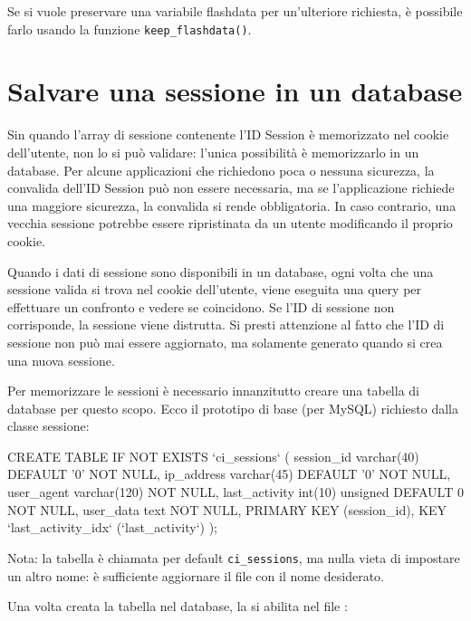 Se si vuole preservare una variabile flashdata per un'ulteriore richiesta, è possibile farlo usando la funzione \verb|keep_flashdata()|.

\section*{Salvare una sessione in un database}
Sin quando l'array di sessione contenente l'ID Session è memorizzato nel cookie dell'utente, non lo si può validare: l'unica possibilità è memorizzarlo in un database. Per alcune applicazioni che richiedono poca o nessuna sicurezza, la convalida dell'ID Session può non essere necessaria, ma se l'applicazione richiede una maggiore sicurezza, la convalida si rende obbligatoria. In caso contrario, una vecchia sessione potrebbe essere ripristinata da un utente modificando il proprio cookie.

Quando i dati di sessione sono disponibili in un database, ogni volta che una sessione valida si trova nel cookie dell'utente, viene eseguita una query per effettuare un confronto e vedere se coincidono. Se l'ID di sessione non corrisponde, la sessione viene distrutta. Si presti attenzione al fatto che l'ID di sessione non può mai essere aggiornato, ma solamente generato quando si crea una nuova sessione.

Per memorizzare le sessioni è necessario innanzitutto creare una tabella di database per questo scopo. Ecco il prototipo di base (per MySQL) richiesto dalla classe sessione:

\begin{code}
CREATE TABLE IF NOT EXISTS  `ci_sessions` (
	session_id varchar(40) DEFAULT '0' NOT NULL,
	ip_address varchar(45) DEFAULT '0' NOT NULL,
	user_agent varchar(120) NOT NULL,
	last_activity int(10) unsigned DEFAULT 0 NOT NULL,
	user_data text NOT NULL,
	PRIMARY KEY (session_id),
	KEY `last_activity_idx` (`last_activity`)
);
\end{code}

Nota: la tabella è chiamata per default \verb|ci_sessions|, ma nulla vieta di impostare un altro nome: è sufficiente aggiornare il file  con il nome desiderato.


Una volta creata la tabella nel database, la si abilita nel file :

